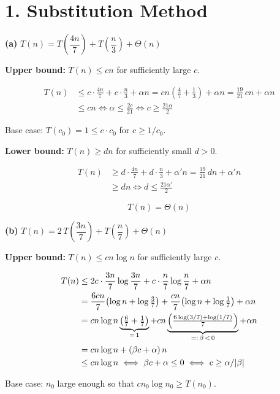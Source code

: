 \documentclass[11pt]{article}
\begin{document}
\section*{1. Substitution Method}

\textbf{(a)} $T(n) = T\!\left(\dfrac{4n}{7}\right) + T\!\left(\dfrac{n}{3}\right) + \Theta(n)$

\textbf{Upper bound:}  $T(n) \le cn$ for sufficiently large $c$.

\begin{align*}
T(n) &\le c\cdot\frac{4n}{7} + c\cdot\frac{n}{3} + \alpha n
= cn\!\left(\frac{4}{7} + \frac{1}{3}\right) + \alpha n
= \frac{19}{21}\,cn + \alpha n \\
&\le cn \iff \alpha \le \frac{2c}{21} \iff c \ge \frac{21\alpha}{2} \quad
\end{align*}

Base case: $T(c_0) = 1 \le c \cdot c_0$ for $c \ge 1/c_0$. 

\textbf{Lower bound:}  $T(n) \ge dn$ for sufficiently small $d > 0$.

\begin{align*}
T(n) &\ge d\cdot\frac{4n}{7} + d\cdot\frac{n}{3} + \alpha' n
= \frac{19}{21}\,dn + \alpha' n \\
&\ge dn \iff d \le \frac{21\alpha'}{2} \quad
\end{align*}

\[
\boxed{T(n) = \Theta(n)}
\]


\textbf{(b)} $T(n) = 2\,T\!\left(\dfrac{3n}{7}\right) + T\!\left(\dfrac{n}{7}\right) + \Theta(n)$

\textbf{Upper bound:}  $T(n) \le cn\log n$ for sufficiently large $c$.

\begin{align*}
T(n) &\le 2c\cdot\frac{3n}{7}\log\frac{3n}{7} + c\cdot\frac{n}{7}\log\frac{n}{7} + \alpha n \\
&= \frac{6cn}{7}\!\left(\log n + \log\tfrac{3}{7}\right) + \frac{cn}{7}\!\left(\log n + \log\tfrac{1}{7}\right) + \alpha n \\
&= cn\log n\underbrace{\left(\tfrac{6}{7}+\tfrac{1}{7}\right)}_{\mathclap{=\,1}} + cn\underbrace{\left(\tfrac{6\log(3/7) + \log(1/7)}{7}\right)}_{\mathclap{=:\,\beta\,<\,0}} + \alpha n \\
&= cn\log n + (\beta c + \alpha)\,n \\
&\le cn\log n \iff \beta c + \alpha \le 0 \iff c \ge \alpha/|\beta| \quad
\end{align*}

Base case: $n_0$ large enough so that $cn_0\log n_0 \ge T(n_0)$. 
\end{document}
